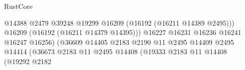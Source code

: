 \begin{lexlean}{RustCore}
\begin{coremodule}
                                                                      @14388
                                                                      @2479
                                                                      @39248
                                                                      @19299
                                                                      @16209
                                                                      (@16192
                                                                        (@16211 @14389 @2495)))
                                                                    @16209
                                                                    (@16192 (@16211 @14379 @14395)))
                                                                  @16227
                                                                  @16231
                                                                  @16236
                                                                  @16241
                                                                  @16247
                                                                  @16256)
                                                                (@36609
                                                                  @14405
                                                                  @2183
                                                                  @2190
                                                                  @11
                                                                  @2495
                                                                  @14409
                                                                  @2495
                                                                  @14414
                                                                  (@36673
                                                                    @2183
                                                                    @11
                                                                    @2495
                                                                    @14408
                                                                    (@19333
                                                                      @2183
                                                                      @11
                                                                      @14408
                                                                      (@19292
                                                                        @2182

\end{coremodule}
\end{lexlean}
